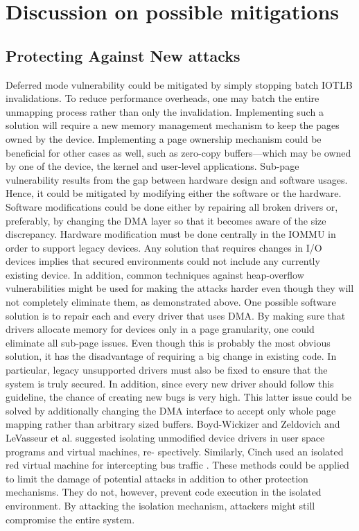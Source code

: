 \section{Discussion on possible mitigations}
\subsection{Protecting Against New attacks}
Deferred mode vulnerability could be mitigated by simply stopping batch IOTLB invalidations. To reduce performance overheads, one may batch the entire unmapping process rather than only the invalidation. Implementing such a solution will require a new memory management mechanism to keep the pages owned by the device. Implementing a page ownership mechanism could be beneficial for other cases as well, such as zero-copy buffers—which may be owned by one of the device, the kernel and user-level applications.
Sub-page vulnerability results from the gap between hardware design and software usages. Hence, it could be mitigated by modifying either the software or the hardware. Software modifications could be done either by repairing all broken drivers or, preferably, by changing the DMA layer so that it becomes aware of the size discrepancy. Hardware modification must be done centrally in the IOMMU in order to support legacy devices. Any solution that requires changes in I/O devices implies that secured environments could not include any currently existing device. In addition, common techniques against heap-overflow vulnerabilities might be used for making the attacks harder even though they will not completely eliminate them, as demonstrated above.
One possible software solution is to repair each and every driver that uses DMA. By making sure that drivers allocate memory for devices only in a page granularity, one could eliminate all sub-page issues. Even though this is probably the most obvious solution, it has the disadvantage of requiring a big change in existing code. In particular, legacy unsupported drivers must also be fixed to ensure that the system is truly secured. In addition, since every new driver should follow this guideline, the chance of creating new bugs is very high. This latter issue could be solved by additionally changing the DMA interface to accept only whole page mapping rather than arbitrary sized buffers.
Boyd-Wickizer and Zeldovich \cite{BWZ10} and LeVasseur et al. \cite{LUSG04} suggested isolating unmodified device drivers in user space programs and virtual machines, re- spectively. Similarly, Cinch used an isolated red virtual machine for intercepting bus traffic \cite{AWH16}. These methods could be applied to limit the damage of potential attacks in addition to other protection mechanisms. They do not, however, prevent code execution in the isolated environment. By attacking the isolation mechanism, attackers might still compromise the entire system.
